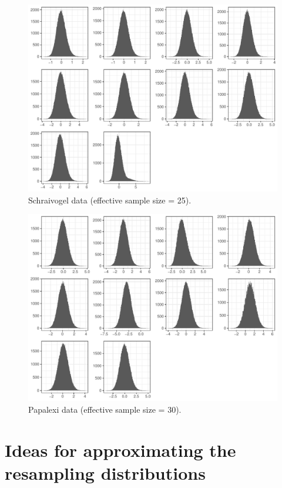 \documentclass[12pt]{article}
\begin{document}
\begin{figure}
	\includegraphics[width = \textwidth]{figures/schraivogel_enhancer_screen_chr11_gene_eff_ss_25.pdf}
	\caption{Schraivogel data (effective sample size = 25).}
	\label{fig:schraivogel-25}
\end{figure}

\begin{figure}
	\includegraphics[width = \textwidth]{figures/papalexi_eccite_screen_gene_eff_ss_30.pdf}
	\caption{Papalexi data (effective sample size = 30).}
	\label{fig:papalexi-30}
\end{figure}

\clearpage

\section{Ideas for approximating the resampling distributions}
\end{document}
